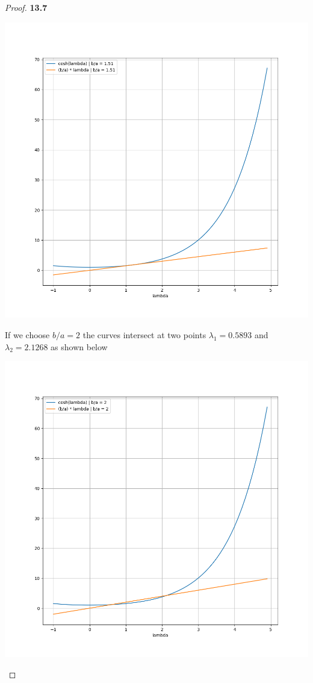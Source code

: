 \documentclass[11pt]{article}
\theoremstyle{definition}
\begin{document}
\begin{proof}{\textbf{13.7}}
\begin{center}
        \includegraphics[scale=0.4]{ch13-7_2.png}
    \end{center}
    
    If we choose $b/a = 2$ the curves intersect at two points
    $\lambda_1 = 0.5893$ and $\lambda_2 = 2.1268$ as shown below
    \begin{center}
        \includegraphics[scale=0.4]{ch13-7_3.png}
    \end{center}
    

\end{proof}
\end{document}
